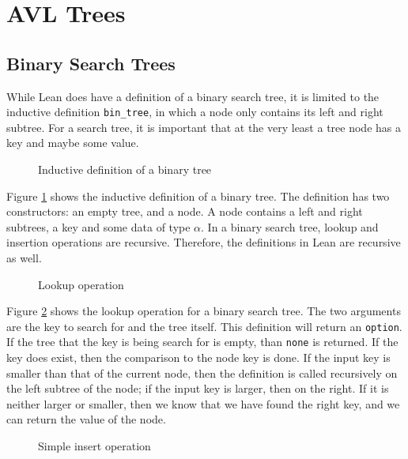 \section{AVL Trees}

\subsection{Binary Search Trees}
While Lean does have a definition of a binary search tree, it is limited to the inductive
definition \lstinline{bin_tree}, in which a node only contains its left and right subtree. For a search tree,
it is important that at the very least a tree node has a key and maybe some value. 

\begin{figure}[!h]
  
  \caption{Inductive definition of a binary tree}
  \label{fig:btree}
\end{figure}

Figure \ref{fig:btree} shows the inductive definition of a binary tree. The definition has two constructors: an empty tree, and a node. 
A node contains a left and right subtrees, a key and some data of type $\alpha$.
In a binary search tree, lookup and insertion operations are recursive. Therefore, the definitions in Lean are recursive as well.

\begin{figure}[!h]
  
  \caption{Lookup operation}
  \label{fig:btree_lookup}
\end{figure}

Figure \ref{fig:btree_lookup} shows the lookup operation for a binary search tree. The two arguments are the key 
to search for and the tree itself. This definition will return an \lstinline{option}.  
If the tree that the key is being search for is empty, 
than \lstinline{none} is returned. If the key does exist, then the comparison to the node key is done. If the input key is smaller than that of the current node, then 
the definition is called recursively on the left subtree of the node; if the input key is larger, then on the right. If it is neither larger or smaller, then we know that we have found the
right key, and we can return the value of the node.

\begin{figure}[!h]
  
  \caption{Simple insert operation}
  \label{fig:btree_insert_simple}
\end{figure}

